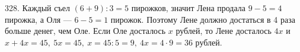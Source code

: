 328. Каждый съел $(6+9):3=5$ пирожков, значит Лена продала $9-5=4$ пирожка, а Оля --- $6-5=1$ пирожок. Поэтому Лене должно достаться в 4 раза больше денег, чем Оле. Если Оле досталось $x$ рублей, то Лене досталось $4x$ и $x+4x=45,\ 5x=45,\ x=45:5=9,\ 4x=4\cdot9=36$ рублей.\\
